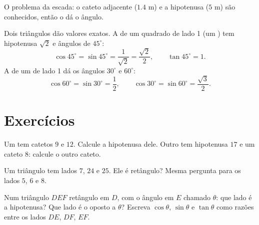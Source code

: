\begin{omfigure}

{\small O problema da escada: o cateto adjacente ($1.4$ m) e a
hipotenusa ($5$ m) são conhecidos, então o  dá o ângulo.}
\end{omfigure}

\begin{example}\label{ex:g9:trig:special}
Dois triângulos dão valores exatos. A  de um quadrado de lado 1
(um  ) tem hipotenusa $\sqrt2$ e ângulos de
$45^\circ$:
\[
\cos 45^\circ = \sin 45^\circ = \frac{1}{\sqrt2} = \frac{\sqrt2}{2},
\qquad \tan 45^\circ = 1 .
\]
A  de um  de lado 1 dá os ângulos $30^\circ$
e $60^\circ$:
\[
\cos 60^\circ = \sin 30^\circ = \frac12,
\qquad
\cos 30^\circ = \sin 60^\circ = \frac{\sqrt3}{2}.
\]
\end{example}

\section{Exercícios}

\begin{exercise}[$\star$]\label{exo:g9:trig:1}
Um  tem catetos $9$ e $12$. Calcule a hipotenusa
dele. Outro tem hipotenusa $17$ e um cateto $8$: calcule o outro
cateto.
\end{exercise}

\begin{exercise}[$\star$]\label{exo:g9:trig:2}
Um triângulo tem lados $7$, $24$ e $25$. Ele é retângulo? Mesma
pergunta para os lados $5$, $6$ e $8$.
\end{exercise}

\begin{exercise}[$\star$]\label{exo:g9:trig:3}
Num triângulo $DEF$ retângulo em $D$, com o ângulo em $E$ chamado
$\theta$: que lado é a hipotenusa? Que lado é o oposto a $\theta$?
Escreva $\cos\theta$, $\sin\theta$ e $\tan\theta$ como razões entre os
lados $DE$, $DF$, $EF$.
\end{exercise}

